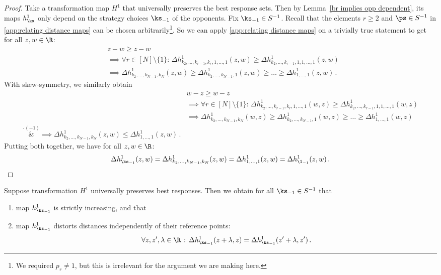 \begin{proof} 
Take a transformation map $H^1$ that universally preserves the best response sets. Then by Lemma~\ref{br implies opp dependent}, its maps $h_{\ks}^1$ only depend on the strategy choices $\ks_{-1}$ of the opponents. Fix $\ks_{-1} \in S^{-1}$. Recall that the elements $r \geq 2$ and $\ps \in S^{-1}$ in \ref{app:relating distance maps} can be chosen arbitrarily\footnote{We required $p_r \neq 1$, but this is irrelevant for the argument we are making here.}. So we can apply \ref{app:relating distance maps} on a trivially true statement to get for all $z,w \in \R$:
\begin{align*}
&z-w \geq z-w \\
&\implies \forall r \in [N] \setminus \{1\}: \, \Delta h_{k_2, \ldots, k_{r-1}, k_r, 1, \ldots, 1}^1(z,w) \geq \Delta h_{k_2, \ldots, k_{r-1}, 1, 1, \ldots, 1}^1(z,w) \\
&\implies \Delta h_{k_2, \ldots, k_{N-1}, k_N}^1(z,w) \geq \Delta h_{k_2, \ldots, k_{N-1}, 1}^1(z,w) \geq \ldots \geq \Delta h_{1, \ldots, 1}^1(z,w) \, . 
\end{align*}
With skew-symmetry, we similarly obtain
\begin{align*}
&w-z \geq w-z \\
&\implies \forall r \in [N] \setminus \{1\}: \, \Delta h_{k_2, \ldots, k_{r-1}, k_r, 1, \ldots, 1}^1(w,z) \geq \Delta h_{k_2, \ldots, k_{r-1}, 1, 1, \ldots, 1}^1(w,z) \\
&\implies \Delta h_{k_2, \ldots, k_{N-1}, k_N}^1(w,z) \geq \Delta h_{k_2, \ldots, k_{N-1}, 1}^1(w,z) \geq \ldots \geq \Delta h_{1, \ldots, 1}^1(w,z) \\
\overset{\cdot \, (-1)}&{\implies} \Delta h_{k_2, \ldots, k_{N-1}, k_N}^1(z,w) \leq \Delta h_{1, \ldots, 1}^1(z,w) \, . 
\end{align*}
Putting both together, we have for all $z,w \in \R$:
\[ \Delta h_{\ks_{-1}}^1(z,w) = \Delta h_{k_2, \ldots, k_{N-1}, k_N}^1(z,w) = \Delta h_{1, \ldots, 1}^1(z,w) = \Delta h_{\1_{-1}}^1(z,w) \, . \]

\end{proof}



\begin{lemma*}
\label{app:strat specific maps behaviour}
Suppose transformation $H^1$ universally preserves best responses. Then we obtain for all $\ks_{-1} \in S^{-1}$ that
\begin{enumerate}
\item map $h_{\ks_{-1}}^1$ is strictly increasing, and that
\item map $h_{\ks_{-1}}^1$ distorts distances independently of their reference points:
\begin{align}
\label{app:distance distortion ind of point}
\forall z,z',\lambda \in \R \, : \, \Delta h_{\ks_{-1}}^1(z + \lambda, z) = \Delta h_{\ks_{-1}}^1(z' + \lambda, z') \, .
\end{align}
\end{enumerate}
\end{lemma*}

